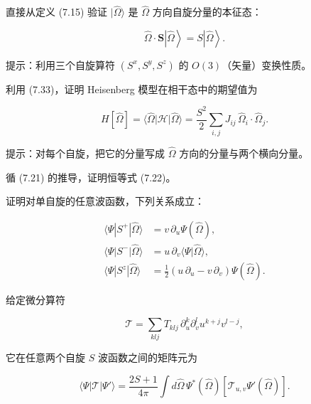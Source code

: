 \begin{exercises}

\item 直接从定义 (7.15) 验证 $|\hat{\Omega}\rangle$ 是 $\hat{\Omega}$ 方向自旋分量的本征态：

\begin{equation*}
\hat {\Omega} \cdot \mathbf {S} \left| \hat {\Omega} \right\rangle = S \left| \hat {\Omega} \right\rangle .
\tag{7.33}
\end{equation*}

提示：利用三个自旋算符 $(S^{x}, S^{y}, S^{z})$ 的 $O(3)$（矢量）变换性质。

\item 利用 (7.33)，证明 Heisenberg 模型在相干态中的期望值为

\begin{equation*}
H [ \hat {\Omega} ] = \langle \hat {\Omega} | \mathcal {H} | \hat {\Omega} \rangle = \frac {S ^ {2}}{2} \sum_ {i, j} J _ {ij} \, \hat {\Omega} _ {i} \cdot \hat {\Omega} _ {j}.
\tag{7.34}
\end{equation*}

提示：对每个自旋，把它的分量写成 $\hat{\Omega}$ 方向的分量与两个横向分量。

\item 循 (7.21) 的推导，证明恒等式 (7.22)。

\item 证明对单自旋的任意波函数，下列关系成立：

\begin{align*}
\langle \Psi | S ^ {+} | \hat {\Omega} \rangle & = v \, \partial_ {u} \Psi ( \hat {\Omega} ) ,\\
\langle \Psi | S ^ {-} | \hat {\Omega} \rangle & = u \, \partial_ {v} \langle \Psi | \hat {\Omega} \rangle ,\\
\langle \Psi | S ^ {z} | \hat {\Omega} \rangle & = \frac {1}{2} \left( u \, \partial_ {u} - v \, \partial_ {v} \right) \Psi ( \hat {\Omega} ) .
\tag{7.35}
\end{align*}

\item 给定微分算符

\begin{equation*}
\mathcal {T} = \sum_ {klj} T _ {klj} \, \partial_ {u} ^ {k} \partial_ {v} ^ {l} u ^ {k + j} v ^ {l - j} ,
\tag{7.36}
\end{equation*}

它在任意两个自旋 $S$ 波函数之间的矩阵元为

\begin{equation*}
\langle \Psi | \mathcal {T} | \Psi ' \rangle = \frac {2 S + 1}{4 \pi} \int d \hat {\Omega} \, \Psi ^ {*} ( \hat {\Omega} ) \left[ \mathcal {T} _ {u, v} \Psi ' ( \hat {\Omega} ) \right].
\tag{7.37}
\end{equation*}


\end{exercises}

